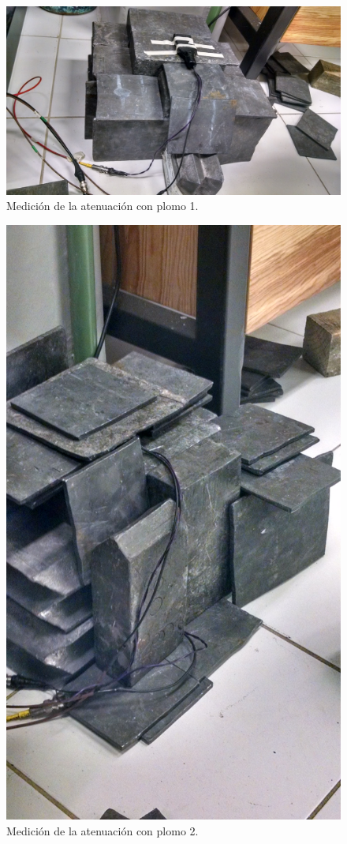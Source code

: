 \documentclass[a4paper,10pt]{article}
\numberwithin{equation}{section}
\begin{document}
\begin{figure}[H]
 \center 
 \includegraphics[scale=0.08]{Imagenes/plomo1}
 \caption{Medición de la atenuación con plomo 1.}
\end{figure}

\begin{figure}[H]
 \center 
 \includegraphics[scale=0.08]{Imagenes/plomo2}
 \caption{Medición de la atenuación con plomo 2.}
\end{figure}
\end{document}
